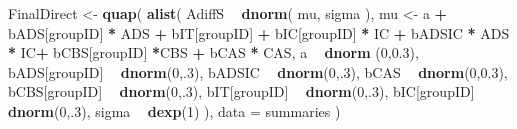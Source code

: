 \documentclass[10pt,dvipsnames,enabledeprecatedfontcommands]{scrartcl}
\newenvironment{Shaded}{\begin{snugshade}}{\end{snugshade}}
\newcommand{\KeywordTok}[1]{\textcolor[rgb]{0.13,0.29,0.53}{\textbf{#1}}}
\newcommand{\DataTypeTok}[1]{\textcolor[rgb]{0.13,0.29,0.53}{#1}}
\newcommand{\DecValTok}[1]{\textcolor[rgb]{0.00,0.00,0.81}{#1}}
\newcommand{\FloatTok}[1]{\textcolor[rgb]{0.00,0.00,0.81}{#1}}
\newcommand{\StringTok}[1]{\textcolor[rgb]{0.31,0.60,0.02}{#1}}
\newcommand{\OperatorTok}[1]{\textcolor[rgb]{0.81,0.36,0.00}{\textbf{#1}}}
\newcommand{\NormalTok}[1]{#1}
\begin{document}
\begin{Shaded}
\begin{Highlighting}[]
\NormalTok{FinalDirect <-}\StringTok{ }\KeywordTok{quap}\NormalTok{(}
  \KeywordTok{alist}\NormalTok{(}
\NormalTok{    AdiffS }\OperatorTok{~}\StringTok{ }\KeywordTok{dnorm}\NormalTok{( mu, sigma ),}
\NormalTok{    mu <-}\StringTok{ }\NormalTok{a }\OperatorTok{+}\StringTok{ }\NormalTok{bADS[groupID] }\OperatorTok{*}\StringTok{ }\NormalTok{ADS }\OperatorTok{+}\StringTok{  }\NormalTok{bIT[groupID] }\OperatorTok{+}\StringTok{ }\NormalTok{bIC[groupID] }\OperatorTok{*}\StringTok{ }\NormalTok{IC }\OperatorTok{+}\StringTok{ }
\StringTok{      }\NormalTok{bADSIC }\OperatorTok{*}\StringTok{ }\NormalTok{ADS }\OperatorTok{*}\StringTok{ }\NormalTok{IC}\OperatorTok{+}\StringTok{ }\NormalTok{bCBS[groupID] }\OperatorTok{*}\NormalTok{CBS }\OperatorTok{+}\StringTok{ }\NormalTok{bCAS }\OperatorTok{*}\StringTok{ }\NormalTok{CAS,}
\NormalTok{    a }\OperatorTok{~}\StringTok{ }\KeywordTok{dnorm}\NormalTok{ (}\DecValTok{0}\NormalTok{,}\FloatTok{0.3}\NormalTok{),}
\NormalTok{    bADS[groupID] }\OperatorTok{~}\StringTok{ }\KeywordTok{dnorm}\NormalTok{(}\DecValTok{0}\NormalTok{,.}\DecValTok{3}\NormalTok{),}
\NormalTok{    bADSIC }\OperatorTok{~}\StringTok{ }\KeywordTok{dnorm}\NormalTok{(}\DecValTok{0}\NormalTok{,.}\DecValTok{3}\NormalTok{),}
\NormalTok{    bCAS }\OperatorTok{~}\StringTok{ }\KeywordTok{dnorm}\NormalTok{(}\DecValTok{0}\NormalTok{,}\FloatTok{0.3}\NormalTok{),}
\NormalTok{    bCBS[groupID] }\OperatorTok{~}\StringTok{ }\KeywordTok{dnorm}\NormalTok{(}\DecValTok{0}\NormalTok{,.}\DecValTok{3}\NormalTok{),}
\NormalTok{    bIT[groupID] }\OperatorTok{~}\StringTok{ }\KeywordTok{dnorm}\NormalTok{(}\DecValTok{0}\NormalTok{,.}\DecValTok{3}\NormalTok{),}
\NormalTok{    bIC[groupID] }\OperatorTok{~}\StringTok{ }\KeywordTok{dnorm}\NormalTok{(}\DecValTok{0}\NormalTok{,.}\DecValTok{3}\NormalTok{),}
\NormalTok{    sigma  }\OperatorTok{~}\StringTok{ }\KeywordTok{dexp}\NormalTok{(}\DecValTok{1}\NormalTok{)}
\NormalTok{  ), }
  \DataTypeTok{data =}\NormalTok{ summaries}
\NormalTok{)}




\end{Highlighting}
\end{Shaded}
\end{document}
